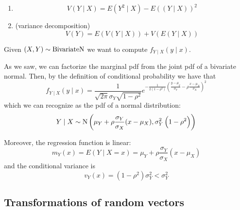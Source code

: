 \documentclass[14pt]{extarticle}
\newcommand{\Normal}{{\operatorfont N}}
\newcommand{\BivariateNormal}{{\operatorfont BivariateN}}
\begin{document}
\begin{theorem}
    \skiplineafterproof
    \begin{enumerate}[label=\roman*.]
        \item \begin{equation}
                  V(Y \mid X) = E(Y^2  \mid  X) - E\left((Y \mid X)\right)^2
              \end{equation}

        \item (variance decomposition)
              \begin{equation}
                  V(Y) = E(V(Y \mid X)) + V(E(Y \mid X))
              \end{equation}
    \end{enumerate}
\end{theorem}

\begin{example}
    Given $(X, Y) \sim \BivariateNormal$ we want to compute $f_{Y \mid X}(y \mid x)$.

    As we saw, we can factorize the marginal pdf from the joint pdf of a bivariate normal.
    Then, by the definition of conditional probability we have that
    \begin{equation}
        f_{Y \mid X}(y \mid x) = \frac{1}{\sqrt{2 \pi} \sigma_Y \sqrt{1-\rho^2}} e^{-\frac{1}{2(1-\rho^2)}\left( \frac{y-\mu_y}{\sigma_Y} - \rho \frac{x-\mu_X}{\sigma_X} \right)^2}
    \end{equation}
    which we can recognize as the pdf of a normal distribution:
    \begin{equation}
        Y \mid X \sim \Normal\left(\mu_Y + \rho\frac{\sigma_Y}{\sigma_X}(x - \mu_X), \sigma_Y^2\left(1-\rho^2\right)\right)
    \end{equation}

    Moreover, the regression function is linear:
    \begin{equation}
        m_Y(x) = E(Y \mid X = x) = \mu_Y + \rho \frac{\sigma_Y}{\sigma_X} (x - \mu_X)
    \end{equation}
    and the conditional variance is
    \begin{equation}
        v_Y(x) = \left(1- \rho^2\right) \sigma_Y^2 < \sigma_Y^2
    \end{equation}
\end{example}

\subsection{Transformations of random vectors}
\end{document}

